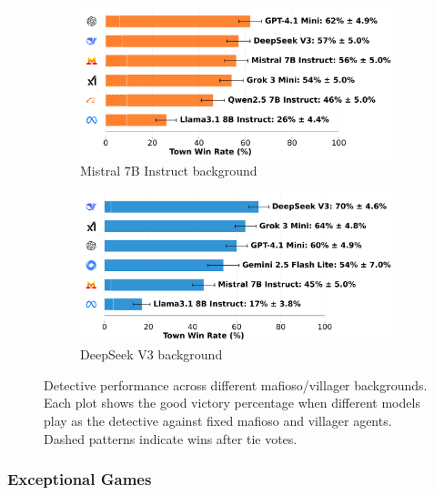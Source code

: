 \documentclass{article}
\begin{document}
\begin{figure}[htbp]
    \begin{subfigure}[b]{0.48\textwidth}
        \centering
        \includegraphics[width=\textwidth]{../results/detective_mistral_7b_instruct_v4_1_benchmark.png}
        \caption{Mistral 7B Instruct background}
        \label{fig:detective_mistral}
    \end{subfigure}
    \hfill
    \begin{subfigure}[b]{0.48\textwidth}
        \centering
        \includegraphics[width=\textwidth]{../results/detective_deepseek_v3_v4_1_benchmark.png}
        \caption{DeepSeek V3 background}
        \label{fig:detective_deepseek}
    \end{subfigure}
    \caption{Detective performance across different mafioso/villager backgrounds. Each plot shows the good victory percentage when different models play as the detective against fixed mafioso and villager agents. Dashed patterns indicate wins after tie votes.}
    \label{fig:disclose_results}
\end{figure}


\subsubsection{Exceptional Games}
\end{document}
